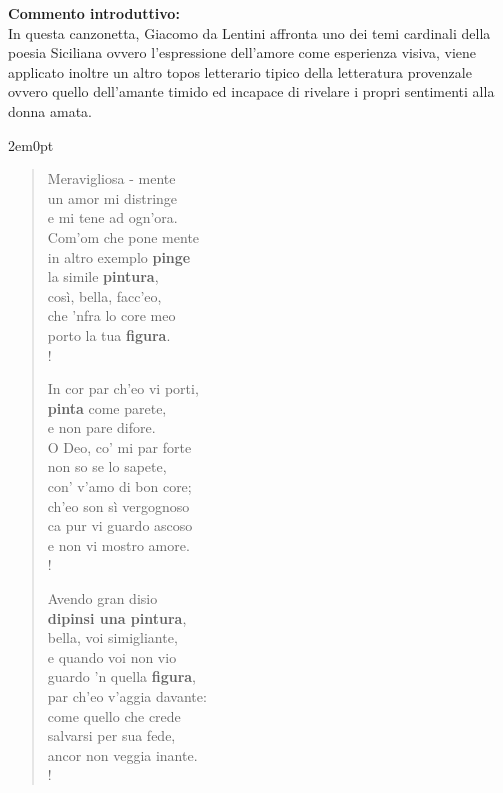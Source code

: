 \newpage
\hypertarget{para:meravigliosamente}{}


\textbf{Commento introduttivo:}\\
In questa canzonetta, Giacomo da Lentini affronta uno dei temi cardinali della poesia Siciliana ovvero l'espressione dell'amore come esperienza visiva, viene applicato inoltre un altro topos letterario tipico della letteratura provenzale ovvero quello dell'amante timido ed incapace di rivelare i propri sentimenti alla donna amata.

\vspace{2em}

\begin{adjustwidth}{2em}{0pt}
\verselinenumbersleft
\begin{verse}
Meravigliosa - mente \label{m1} \\
un amor mi distringe \label{m2} \\
e mi tene ad ogn’ora. \label{m3} \\
Com’om che pone mente \label{m4} \\
in altro exemplo \textbf{pinge} \label{m5} \\
la simile \textbf{pintura}, \label{m6} \\
così, bella, facc’eo, \label{m7} \\
che ’nfra lo core meo \label{m8} \\
porto la tua \textbf{figura}. \label{m9} \\!

In cor par ch’eo vi porti, \label{m10} \\
\textbf{pinta} come parete, \label{m11} \\
e non pare difore. \label{m12} \\
O Deo, co’ mi par forte \label{m13} \\
non so se lo sapete, \label{m14} \\
con’ v’amo di bon core; \label{m15} \\
ch’eo son sì vergognoso \label{m16} \\
ca pur vi guardo ascoso \label{m17} \\
e non vi mostro amore. \label{m18} \\!

Avendo gran disio \label{m19} \\
\textbf{dipinsi una pintura}, \label{m20} \\
bella, voi simigliante, \label{m21} \\
e quando voi non vio \label{m22} \\
guardo ’n quella \textbf{figura}, \label{m23} \\
par ch’eo v’aggia davante: \label{m24} \\
come quello che crede \label{m25} \\
salvarsi per sua fede, \label{m26} \\
ancor non veggia inante. \label{m27} \\!


\end{verse}
\end{adjustwidth}
